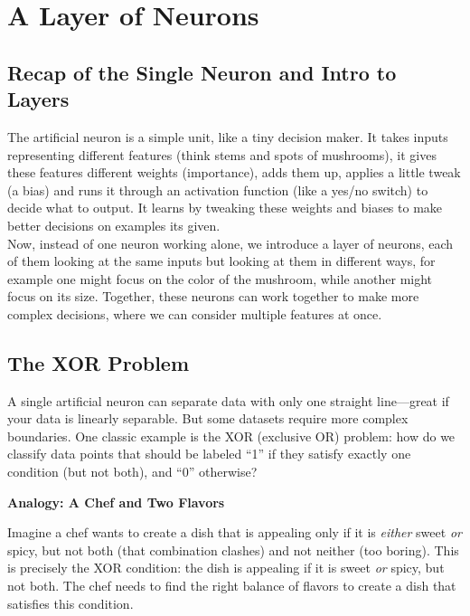\documentclass[9pt]{extarticle}
\theoremstyle{plain}
\theoremstyle{definition}
\theoremstyle{remark}
\begin{document}
\pagebreak


\section{A Layer of Neurons}
\subsection{Recap of the Single Neuron and Intro to Layers}
The artificial neuron is a simple unit, like a tiny decision maker. It takes inputs representing different features (think stems and spots of mushrooms), it gives these features different weights (importance), adds them up, applies a little tweak (a bias) and runs it through an activation function (like a yes/no switch) to decide what to output. It learns by tweaking these weights and biases to make better decisions on examples its given. \\ [2ex]
Now, instead of one neuron working alone, we introduce a layer of neurons, each of them looking at the same inputs but looking at them in different ways, for example one might focus on the color of the mushroom, while another might focus on its size. Together, these neurons can work together to make more complex decisions, where we can consider multiple features at once.

\subsection{The XOR Problem}
A single artificial neuron can separate data with only one straight line—great if your data is linearly separable. But some datasets require more complex boundaries. One classic example is the XOR (exclusive OR) problem: how do we classify data points that should be labeled “1” if they satisfy exactly one condition (but not both), and “0” otherwise?

\vspace{1em} \noindent \textbf{Analogy: A Chef and Two Flavors}

\noindent Imagine a chef wants to create a dish that is appealing only if it is \textit{either} sweet \textit{or} spicy, but not both (that combination clashes) and not neither (too boring). This is precisely the XOR condition: the dish is appealing if it is sweet \textit{or} spicy, but not both. The chef needs to find the right balance of flavors to create a dish that satisfies this condition.
\end{document}
